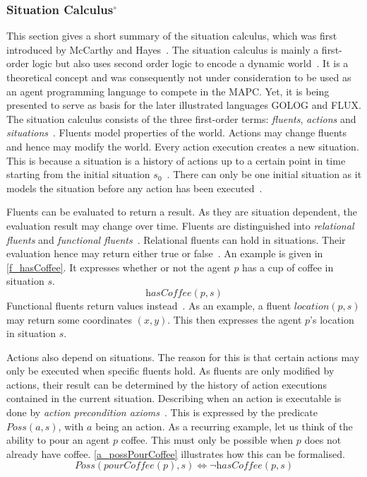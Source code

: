 \subsubsection[Situation Calculus]{Situation Calculus$^\circ$}\label{fun:apl_sitCalc}
This section gives a short summary of the situation calculus, which was first introduced by McCarthy and Hayes~\cite{mccarthy_philosophical_1969}.
The situation calculus is mainly a first-order logic but also uses second order logic to encode a dynamic world~\cite{levesque_golog:_1997}. %
It is a theoretical concept and was consequently not under consideration to be used as an agent programming language to compete in the MAPC.
Yet, it is being presented to serve as basis for the later illustrated languages GOLOG and FLUX.
The situation calculus consists of the three first-order terms: \emph{fluents}, \emph{actions} and \emph{situations}~\cite{mccarthy_philosophical_1969,boutilier_decision_2000}. %
Fluents model properties of the world.
Actions may change fluents and hence may modify the world.
Every action execution creates a new situation.
This is because a situation is a history of actions up to a certain point in time starting from the initial situation $s_0$~\cite{schiffel_reconciling_2006,levesque_golog:_1997}. %
There can only be one initial situation as it models the situation before any action has been executed~\cite{pirri_contributions_1999}. %

Fluents can be evaluated to return a result.
As they are situation dependent, the evaluation result may change over time.
Fluents are distinguished into \emph{relational fluents} and \emph{functional fluents}~\cite{levesque_golog:_1997}. %
Relational fluents can hold in situations.
Their evaluation hence may return either true or false~\cite{boutilier_decision_2000}. %
An example is given in \autoref{f_hasCoffee}.
It expresses whether or not the agent $p$ has a cup of coffee in situation $s$.
\begin{equation}\label{f_hasCoffee}
  \textit{hasCoffee}(p,s)
\end{equation}
Functional fluents return values instead~\cite{levesque_golog:_1997}. %
As an example, a fluent $\textit{location}(p,s)$ may return some coordinates $(x,y)$.
This then expresses the agent $p$'s location in situation $s$.

Actions also depend on situations.
The reason for this is that certain actions may only be executed when specific fluents hold.
As fluents are only modified by actions, their result can be determined by the history of action executions contained in the current situation.
Describing when an action is executable is done by \emph{action precondition axioms}~\cite{lin_state_1994}. %
This is expressed by the predicate $\textit{Poss}(a,s)$, with $a$ being an action.
As a recurring example, let us think of the ability to pour an agent $p$ coffee.
This must only be possible when $p$ does not already have coffee.
\autoref{a_possPourCoffee} illustrates how this can be formalised.
\begin{equation}\label{a_possPourCoffee}
  \textit{Poss}(\textit{pourCoffee}(p),s) \Leftrightarrow \neg \textit{hasCoffee}(p,s)
\end{equation}

